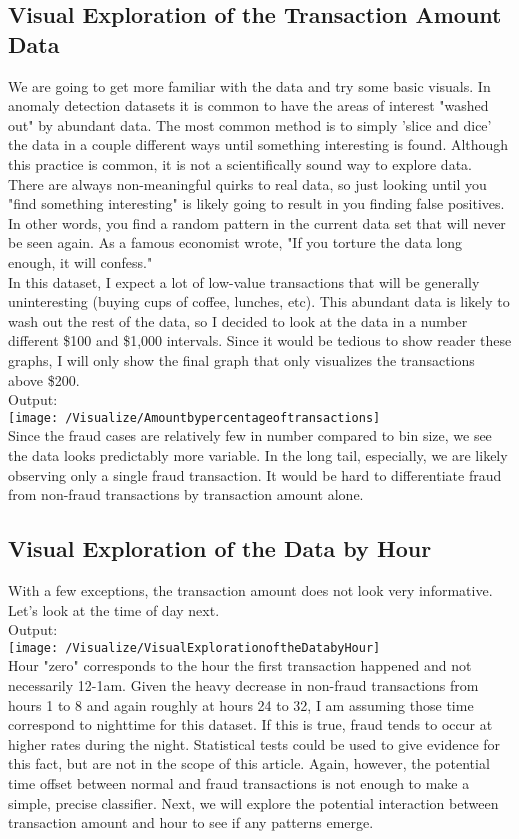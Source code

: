 \documentclass[17pt]{report}
\begin{document}
\subsection{Visual Exploration of the Transaction Amount Data}
We are going to get more familiar with the data and try some basic visuals. In anomaly detection datasets it is
common to have the areas of interest "washed out" by abundant data. The most common method is to simply
'slice and dice' the data in a couple different ways until something interesting is found. Although this practice is
common, it is not a scientifically sound way to explore data. There are always non-meaningful quirks to real
data, so just looking until you "find something interesting" is likely going to result in you finding false positives.
In other words, you find a random pattern in the current data set that will never be seen again. As a
famous economist wrote, "If you torture the data long enough, it will confess."\\
In this dataset, I expect a lot of low-value transactions that will be generally uninteresting (buying cups of coffee,
lunches, etc). This abundant data is likely to wash out the rest of the data, so I decided to look at the data in a
number different \$100 and \$1,000 intervals. Since it would be tedious to show reader these graphs, I will only
show the final graph that only visualizes the transactions above \$200.\\

Output:\\
\texttt{[image: /Visualize/Amountbypercentageoftransactions]}\\
Since the fraud cases are relatively few in number compared to bin size, we see the data looks predictably more
variable. In the long tail, especially, we are likely observing only a single fraud transaction. It would be hard to
differentiate fraud from non-fraud transactions by transaction amount alone.
\subsection{Visual Exploration of the Data by Hour}
With a few exceptions, the transaction amount does not look very informative. Let's look at the time of day next.\\

Output:\\
\texttt{[image: /Visualize/VisualExplorationoftheDatabyHour]}\\
Hour "zero" corresponds to the hour the first transaction happened and not necessarily 12-1am. Given the
heavy decrease in non-fraud transactions from hours 1 to 8 and again roughly at hours 24 to 32, I am assuming
those time correspond to nighttime for this dataset. If this is true, fraud tends to occur at higher rates during the
night. Statistical tests could be used to give evidence for this fact, but are not in the scope of this article. Again,
however, the potential time offset between normal and fraud transactions is not enough to make a simple,
precise classifier.
Next, we will explore the potential interaction between transaction amount and hour to see if any patterns
emerge.
\end{document}
